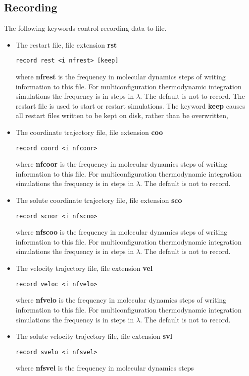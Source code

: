 \subsection{Recording}
The following keywords control recording data to file.
\begin{itemize}
\item
The restart file, file extension {\bf rst}
\begin{verbatim}
record rest <i nfrest> [keep]
\end{verbatim}
where {\bf nfrest} is the frequency in molecular dynamics steps
of writing information to this file. For multiconfiguration
thermodynamic integration simulations the frequency is in
steps in $\lambda$. The default is not to record. The restart
file is used to start or restart simulations. The keyword {\bf keep}
causes all restart files written to be kept on disk, rather than
be overwritten, 
\item
The coordinate trajectory file, file extension {\bf coo}
\begin{verbatim}
record coord <i nfcoor>
\end{verbatim}
where {\bf nfcoor} is the frequency in molecular dynamics steps
of writing information to this file. For multiconfiguration
thermodynamic integration simulations the frequency is in
steps in $\lambda$. The default is not to record.
\item
The solute coordinate trajectory file, file extension {\bf sco}
\begin{verbatim}
record scoor <i nfscoo>
\end{verbatim}
where {\bf nfscoo} is the frequency in molecular dynamics steps
of writing information to this file. For multiconfiguration
thermodynamic integration simulations the frequency is in
steps in $\lambda$. The default is not to record.
\item
The velocity trajectory file, file extension {\bf vel}
\begin{verbatim}
record veloc <i nfvelo>
\end{verbatim}
where {\bf nfvelo} is the frequency in molecular dynamics steps
of writing information to this file. For multiconfiguration
thermodynamic integration simulations the frequency is in
steps in $\lambda$. The default is not to record.
\item
The solute velocity trajectory file, file extension {\bf svl}
\begin{verbatim}
record svelo <i nfsvel>
\end{verbatim}
where {\bf nfsvel} is the frequency in molecular dynamics steps

\end{itemize}
